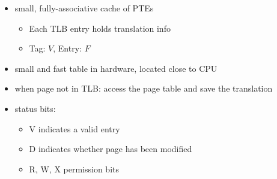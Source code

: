 \documentclass{article}
\begin{document}
\begin{itemize}
	\item small, fully-associative cache of PTEs \begin{itemize}
		\item Each TLB entry holds translation info
		\item Tag: $V$, Entry: $F$
	\end{itemize}
	\item small and fast table in hardware, located close to CPU
	\item when page not in TLB: access the page table and save the translation
	\item status bits: \begin{itemize}
		\item V indicates a valid entry
		\item D indicates whether page has been modified
		\item R, W, X permission bits
	\end{itemize} 
\end{itemize}
\end{document}
